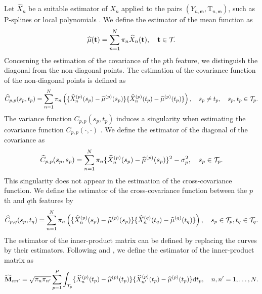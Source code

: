 Let $\widehat{X}_n$ be a suitable estimator of $X_n$ applied to the pairs $(Y_{n, \mathsf{m}}, \mathrm{T}_{n, \mathsf{m}})$, such as P-splines \cite[e.g.][]{eilersTwentyYearsPsplines2015} or local polynomials \cite[e.g.][]{fanLocalPolynomialModelling1996}. We define the estimator of the mean function as
\begin{equation}
    \widehat{\mu}(\mathbf{t}) = \sum_{n = 1}^N \pi_n \widehat{X}_n(\mathbf{t}), \quad \mathbf{t} \in \mathcal{T}_{}.
\end{equation}
Concerning the estimation of the covariance of the $p$th feature, we distinguish the diagonal from the non-diagonal points. The estimation of the covariance function of the non-diagonal points is defined as
\begin{equation}\label{eq:cov_estimation}
    \widehat{C}_{p, p}(s_p, t_p) = \sum_{n = 1}^N \pi_n\left(\{\widehat{X}_n^{(p)}(s_p) - \widehat{\mu}^{(p)}(s_p)\}\{\widehat{X}_n^{(p)}(t_p) - \widehat{\mu}^{(p)}(t_p)\}\right), \quad s_p \neq t_p, \quad s_p, t_p \in \mathcal{T}_{p}.
\end{equation}
The variance function $C_{p, p}(s_p, t_p)$ induces a singularity when estimating the covariance function $C_{p, p}(\cdot, \cdot)$ \cite[see][]{yaoFunctionalDataAnalysis2005,zhangSparseDenseFunctional2016}. We define the estimator of the diagonal of the covariance as
\begin{equation}\label{eq:Cpp}
    \widehat{C}_{p, p}(s_p, s_p) = \sum_{n = 1}^N \pi_n\{\widehat{X}_n^{(p)}(s_p) - \widehat{\mu}^{(p)}(s_p)\}^2 - \sigma_p^2, \quad s_p \in \mathcal{T}_{p}.
\end{equation}
This singularity does not appear in the estimation of the cross-covariance function. We define the estimator of the cross-covariance function between the $p$th and $q$th features by
\begin{equation}
    \widehat{C}_{p, q}(s_p, t_q) = \sum_{n = 1}^N \pi_n\left(\{\widehat{X}_n^{(p)}(s_p) - \widehat{\mu}^{(p)}(s_p)\}\{\widehat{X}_n^{(q)}(t_q) - \widehat{\mu}^{(q)}(t_q)\}\right), \quad s_p \in \mathcal{T}_{p}, t_q \in \mathcal{T}_{q}.
\end{equation}
The estimator of the inner-product matrix can be defined by replacing the curves by their estimators. Following \cite{benkoCommonFunctionalPrincipal2009} and \cite{grithFunctionalPrincipalComponent2018}, we define the estimator of the inner-product matrix as
\begin{equation}
    \widehat{\mathbf{M}}_{nn^\prime} = \sqrt{\pi_n \pi_{n^{\prime}}}\sum_{p = 1}^P \int_{\mathcal{T}_{p}}\{\widehat{X}_n^{(p)}(t_p) - \widehat{\mu}^{(p)}(t_p)\}\{\widehat{X}^{(p)}_{n^\prime}(t_p) - \widehat{\mu}^{(p)}(t_p)\} {\rm d} t_p, \quad n, n^\prime = 1, \dots, N.
\end{equation}
